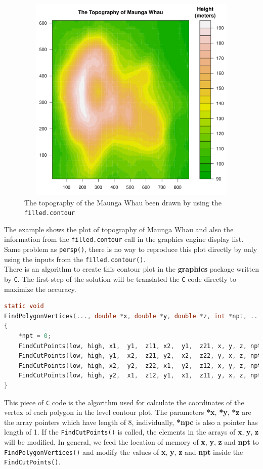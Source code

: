 \documentclass{report}
\begin{document}
\begin{figure}[h]
	\begin{center}
		\includegraphics[height = 10cm, width = 12cm]{figure/filled_example_1.pdf}
		\caption{The topography of the Maunga Whau been drawn by using the \texttt{filled.contour}}
		\label{figure_3.6}
	\end{center}
\end{figure}
The example shows the plot of topography of Maunga Whau and also the information from the \texttt{filled.contour} call in the graphics engine display list. Same problem as \texttt{persp()}, there is no way to reproduce this plot directly by only using the inputs from the \texttt{filled.contour()}.\\

There is an algorithm to create this contour plot in the \textbf{graphics} package written by \texttt{C}. The first step of the solution will be translated the \texttt{C} code directly to maximize the accuracy.\\

\begin{lstlisting}[language = C]
static void
FindPolygonVertices(..., double *x, double *y, double *z, int *npt, ...)
{
    *npt = 0;
    FindCutPoints(low, high, x1,  y1,  z11, x2,  y1,  z21, x, y, z, npt);
    FindCutPoints(low, high, y1,  x2,  z21, y2,  x2,  z22, y, x, z, npt);
    FindCutPoints(low, high, x2,  y2,  z22, x1,  y2,  z12, x, y, z, npt);
    FindCutPoints(low, high, y2,  x1,  z12, y1,  x1,  z11, y, x, z, npt);
}
\end{lstlisting}
This piece of \texttt{C} code is the algorithm used for calculate the coordinates of the vertex of each polygon in the level contour plot. The parameters \textbf{*x}, \textbf{*y}, \textbf{*z} are the array pointers which have length of 8, individually, \textbf{*npc} is also a pointer has length of 1. If the \texttt{FindCutPoints()} is called, the elements in the arrays of \textbf{x}, \textbf{y}, \textbf{z} will be modified. In general, we feed the location of memory of \textbf{x}, \textbf{y}, \textbf{z} and \textbf{npt} to \texttt{FindPolygonVertices()} and modify the values of \textbf{x}, \textbf{y}, \textbf{z} and \textbf{npt} inside the \texttt{FindCutPoints()}.\\
\end{document}

